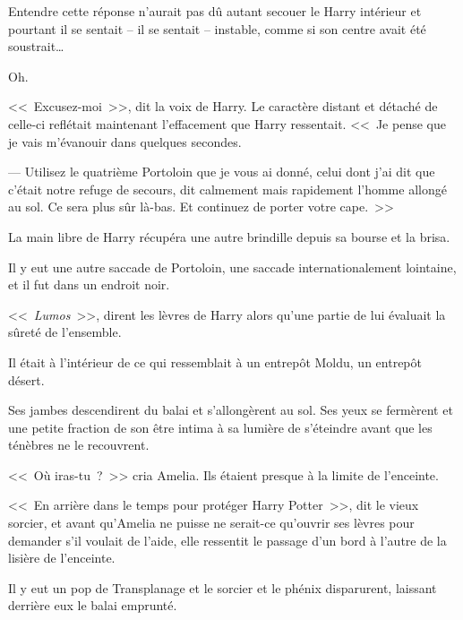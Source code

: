 Entendre cette réponse n'aurait pas dû autant secouer le Harry intérieur et pourtant il se sentait -- il se sentait -- instable, comme si son centre avait été soustrait…

Oh.

<<~Excusez-moi~>>, dit la voix de Harry. Le caractère distant et détaché de celle-ci reflétait maintenant l'effacement que Harry ressentait. <<~Je pense que je vais m'évanouir dans quelques secondes.

--- Utilisez le quatrième Portoloin que je vous ai donné, celui dont j'ai dit que c'était notre refuge de secours, dit calmement mais rapidement l'homme allongé au sol. Ce sera plus sûr là-bas. Et continuez de porter votre cape.~>>

La main libre de Harry récupéra une autre brindille depuis sa bourse et la brisa.

Il y eut une autre saccade de Portoloin, une saccade internationalement lointaine, et il fut dans un endroit noir.

<<~\emph{Lumos}~>>, dirent les lèvres de Harry alors qu'une partie de lui évaluait la sûreté de l'ensemble.

Il était à l'intérieur de ce qui ressemblait à un entrepôt Moldu, un entrepôt désert.

Ses jambes descendirent du balai et s'allongèrent au sol. Ses yeux se fermèrent et une petite fraction de son être intima à sa lumière de s'éteindre avant que les ténèbres ne le recouvrent.

\later

<<~Où iras-tu~?~>> cria Amelia. Ils étaient presque à la limite de l'enceinte.

<<~En arrière dans le temps pour protéger Harry Potter~>>, dit le vieux sorcier, et avant qu'Amelia ne puisse ne serait-ce qu'ouvrir ses lèvres pour demander s'il voulait de l'aide, elle ressentit le passage d'un bord à l'autre de la lisière de l'enceinte.

Il y eut un pop de Transplanage et le sorcier et le phénix disparurent, laissant derrière eux le balai emprunté.

